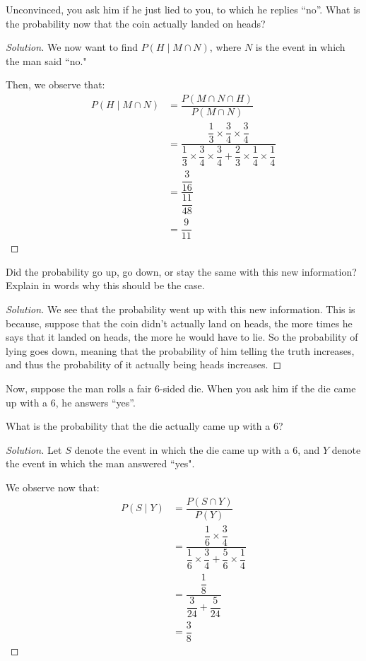 \documentclass{article}
\newenvironment{solution}{\begin{proof}[Solution]}{\end{proof}}
\begin{document}
\begin{hw}
	Unconvinced, you ask him if he just lied to you, to which he replies ``no''. What is the probability now that the coin actually landed on heads?
\end{hw}
\begin{solution}
	We now want to find $P(H \mid M \cap N)$, where $N$ is the event in which the man said ``no."
	
	Then, we observe that:
	\begin{align*}
		P(H \mid M \cap N) &= \dfrac{P(M \cap N \cap H)}{P(M \cap N)} \\
		&= \dfrac{\dfrac{1}{3} \times \dfrac{3}{4} \times \dfrac{3}{4}}{\dfrac{1}{3} \times \dfrac{3}{4} \times \dfrac{3}{4} + \dfrac{2}{3} \times \dfrac{1}{4} \times \dfrac{1}{4}} \\
		&= \dfrac{\dfrac{3}{16}}{\dfrac{11}{48}} \\
		&= \dfrac{9}{11}
	\end{align*}
\end{solution}

\begin{hw}
	Did the probability go up, go down, or stay the same with this new information? Explain in words why this should be the case.
\end{hw}
\begin{solution}
	We see that the probability went up with this new information. This is because, suppose that the coin didn't actually land on heads, the more times he says that it landed on heads, the more he would have to lie. So the probability of lying goes down, meaning that the probability of him telling the truth increases, and thus the probability of it actually being heads increases.
\end{solution}

Now, suppose the man rolls a fair $6$-sided die. When you ask him if the die came up with a $6$, he answers ``yes''.
\begin{hw}
	What is the probability that the die actually came up with a 6?
\end{hw}
\begin{solution}
	Let $S$ denote the event in which the die came up with a 6, and $Y$ denote the event in which the man answered ``yes".
	
	We observe now that:
	\begin{align*}
		P(S \mid Y) &= \dfrac{P(S \cap Y)}{P(Y)} \\
		&= \dfrac{\dfrac{1}{6} \times \dfrac{3}{4}}{\dfrac{1}{6} \times \dfrac{3}{4} + \dfrac{5}{6} \times \dfrac{1}{4}} \\
		&= \dfrac{\dfrac{1}{8}}{\dfrac{3}{24} + \dfrac{5}{24}} \\
		&= \dfrac{3}{8}
	\end{align*}
\end{solution}
\end{document}

